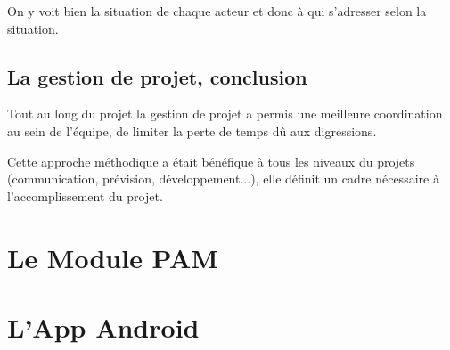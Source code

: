 On y voit bien la situation de chaque acteur et donc à qui s'adresser selon la situation.


\subsection{La gestion de projet, conclusion}

Tout au long du projet la gestion de projet a permis une meilleure coordination au sein de l'équipe, de limiter la perte de temps dû aux digressions.

Cette approche méthodique a était bénéfique à tous les niveaux du projets (communication, prévision, développement...), elle définit un cadre nécessaire à l'accomplissement du projet.



\section{Le Module PAM}

\section{L'App Android}
